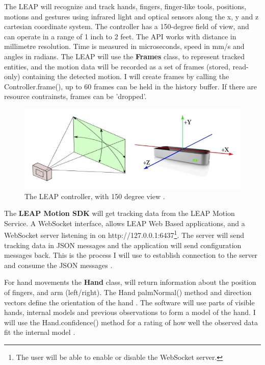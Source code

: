 \documentclass[a4paper, 10pt]{article}
\begin{document}
The LEAP will recognize and track hands, fingers, finger-like tools, positions, motions and gestures using infrared light and optical sensors along the x, y and z cartesian coordinate system. The controller has a 150-degree field of view, and can operate in a range of 1 inch to 2 feet. The API works with distance in millimetre resolution. Time is measured in microseconds, speed in mm/s and angles in radians. The LEAP will use the \textbf{Frames} class, to represent tracked entities, and the motion data will be recorded as a set of frames (stored, read-only) containing the detected motion. I will create frames by calling the Controller.frame(), up to 60 frames can be held in the history buffer. If there are resource contrainsts, frames can be 'dropped'.

\begin{figure}[H]
\begin{center}
\includegraphics[scale=0.4]{leap}\\
The LEAP controller, with 150 degree view \cite{leap}.
\end{center}
\end{figure}

The \textbf{LEAP Motion SDK} will get tracking data from the LEAP Motion Service. A WebSocket interface, allows LEAP Web Based applications, and a WebSocket server listening in on http://127.0.0.1:6437\footnote{The user will be able to enable or disable the WebSocket server.}. The server will send tracking data in JSON messages and the application will send configuration messages back. This is the process I will use to establish connection to the server and consume the JSON messages \cite{leap}. 

For hand movements the \textbf{Hand} class, will return information about the position of fingers, and arm (left/right). The Hand palmNormal() method and direction vectors define the orientation of the hand \cite{leap}. The software will use parts of visible hands, internal models and previous observations to form a model of the hand. I will use the Hand.confidence() method for a rating of how well the observed data fit the internal model \cite{leap}.
\end{document}
